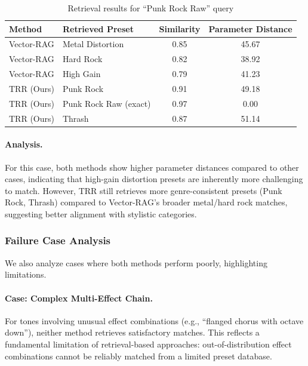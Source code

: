 \begin{table}[h]
	\centering
	\caption{Retrieval results for ``Punk Rock Raw'' query}
	\label{tab:punk_retrieval}
	\begin{tabular}{llcc}
		\toprule
		\textbf{Method} & \textbf{Retrieved Preset} & \textbf{Similarity} & \textbf{Parameter Distance} \\
		\midrule
		Vector-RAG      & Metal Distortion          & 0.85                & 45.67                       \\
		Vector-RAG      & Hard Rock                 & 0.82                & 38.92                       \\
		Vector-RAG      & High Gain                 & 0.79                & 41.23                       \\
		\midrule
		TRR (Ours)      & Punk Rock                 & 0.91                & 49.18                       \\
		TRR (Ours)      & Punk Rock Raw (exact)     & 0.97                & 0.00                        \\
		TRR (Ours)      & Thrash                    & 0.87                & 51.14                       \\
		\bottomrule
	\end{tabular}
\end{table}

\paragraph{Analysis.} For this case, both methods show higher parameter distances compared to other cases, indicating that high-gain distortion presets are inherently more challenging to match. However, TRR still retrieves more genre-consistent presets (Punk Rock, Thrash) compared to Vector-RAG's broader metal/hard rock matches, suggesting better alignment with stylistic categories.

\subsubsection{Failure Case Analysis}

We also analyze cases where both methods perform poorly, highlighting limitations.

\paragraph{Case: Complex Multi-Effect Chain.} For tones involving unusual effect combinations (e.g., ``flanged chorus with octave down''), neither method retrieves satisfactory matches. This reflects a fundamental limitation of retrieval-based approaches: out-of-distribution effect combinations cannot be reliably matched from a limited preset database.

